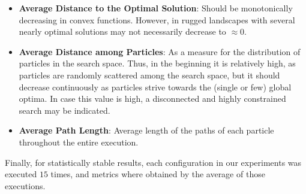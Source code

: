 \documentclass[12pt]{article}
\begin{document}
\begin{itemize}
	
	\item \textbf{Average Distance to the Optimal Solution}: Should be monotonically decreasing in convex functions. However, in rugged landscapes with several nearly optimal solutions may not necessarily decrease to $\approx 0$.
	\item \textbf{Average Distance among Particles}: As a measure for the distribution of particles in the search space. 
	Thus, in the beginning it is relatively high, as particles are randomly scattered among the search space, but it should decrease continuously as particles strive towards the (single or few) global optima. 
	In case this value is high, a disconnected and highly constrained search may be indicated. 
	\item \textbf{Average Path Length}: Average length of the paths of each particle throughout the entire execution.
		
\end{itemize}

Finally, for statistically stable results, each configuration in our experiments was executed $15$ times, and metrics where obtained by the average of those executions.
%
%
%
\end{document}
